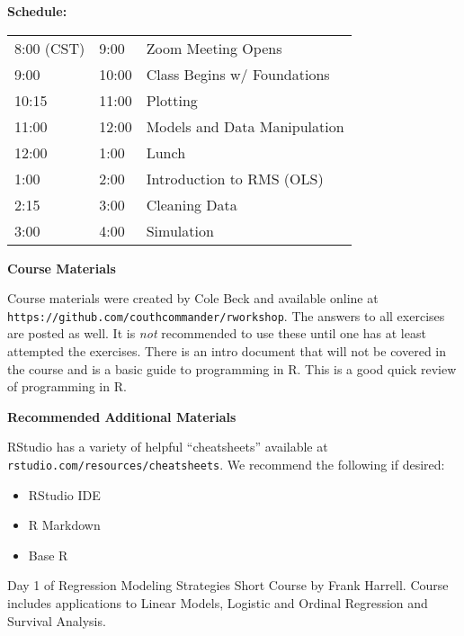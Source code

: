 \documentclass[twocolumn]{article}
\begin{document}
\begin{flushleft}

\vspace*{0.5cm}

\textbf{Schedule:}

\begin{tabular}[H]{lll}
8:00 (CST) & 9:00 & Zoom Meeting Opens \\
9:00 & 10:00  & Class Begins w/ Foundations \\
10:15 & 11:00 & Plotting \\
11:00 & 12:00 & Models and Data Manipulation \\
12:00 & 1:00  & Lunch \\
1:00  & 2:00  & Introduction to RMS (OLS) \\
2:15  & 3:00  & Cleaning Data \\
3:00  & 4:00  & Simulation \\
\end{tabular}

\vspace*{\fill}

\textbf{Course Materials}

Course materials were created by Cole Beck and available online at
\texttt{https://github.com/couthcommander/rworkshop}. The answers to
all exercises are posted as well. It is \emph{not} recommended to use
these until one has at least attempted the exercises. There is an intro document that will not be covered in the course and is a basic guide to programming in R. This is a good quick review of programming in R.


\vspace*{\fill}

\textbf{Recommended Additional Materials}

RStudio has a variety of helpful ``cheatsheets'' available at \texttt{rstudio.com/resources/cheatsheets}. We recommend the following if desired:

\begin{itemize}
\item RStudio IDE
\item R Markdown
\item Base R
\end{itemize}

\vspace*{\fill}

Day 1 of Regression Modeling Strategies Short Course by Frank Harrell. Course includes applications to Linear Models, Logistic and Ordinal Regression and Survival Analysis.

\end{flushleft}
\end{document}
